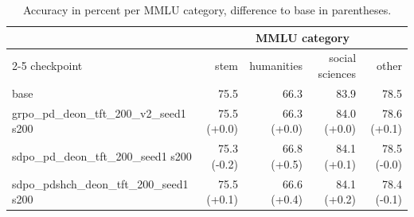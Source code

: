 \begin{table}[t]
\centering
\caption{Accuracy in percent per MMLU category, difference to base in parentheses.}
\label{tab:T2-mmlu-categories}
\small
\setlength{\tabcolsep}{3.5pt}
\begin{tabular}{lrrrr}
\toprule
 & \multicolumn{4}{c}{MMLU category} \\
\cmidrule(lr){2-5}
checkpoint & stem & humanities & social sciences & other \\
\midrule
base & 75.5 & 66.3 & 83.9 & 78.5 \\
grpo_pd_deon_tft_200_v2_seed1 s200 & 75.5 (+0.0) & 66.3 (+0.0) & 84.0 (+0.0) & 78.6 (+0.1) \\
sdpo_pd_deon_tft_200_seed1 s200 & 75.3 (-0.2) & 66.8 (+0.5) & 84.1 (+0.1) & 78.5 (-0.0) \\
sdpo_pdshch_deon_tft_200_seed1 s200 & 75.5 (+0.1) & 66.6 (+0.4) & 84.1 (+0.2) & 78.4 (-0.1) \\
\bottomrule
\end{tabular}
\end{table}
